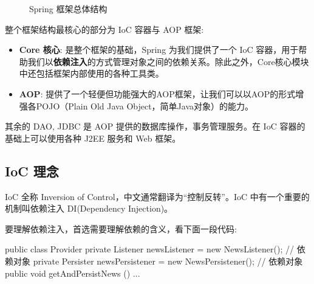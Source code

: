 \begin{figure}[H]
    \caption{Spring 框架总体结构}
    \label{fig:Spring 框架总体结构}
\end{figure}

整个框架结构最核心的部分为 IoC 容器与 AOP 框架:
\begin{itemize}
    \item \textbf{Core 核心}: 是整个框架的基础，Spring 为我们提供了一个 IoC 容器，用于帮助我们以\textbf{依赖注入}的方式管理对象之间的依赖关系。除此之外，Core核心模块中还包括框架内部使用的各种工具类。
    \item \textbf{AOP}: 提供了一个轻便但功能强大的AOP框架，让我们可以以AOP的形式增强各POJO（Plain Old Java Object，简单Java对象）的能力。
\end{itemize}

其余的 DAO, JDBC 是 AOP 提供的数据库操作，事务管理服务。在 IoC 容器的基础上可以使用各种 J2EE 服务和 Web 框架。

\subsection{IoC 理念}

IoC 全称 Inversion of Control，中文通常翻译为“控制反转”。IoC 中有一个重要的机制叫依赖注入 DI(Dependency Injection)。


要理解依赖注入，首选需要理解依赖的含义，看下面一段代码:

\begin{Java}
public class Provider {
    private Listener newsListener = new NewsListener();      // 依赖对象
    private Persister newsPersistener = new NewsPersistener();   // 依赖对象
    public void getAndPersistNews () {
        ...
    }
}
\end{Java}

